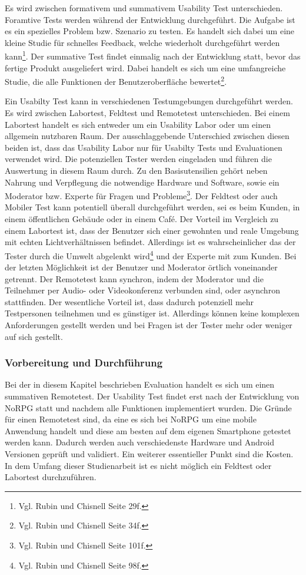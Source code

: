 		Es wird zwischen formativem und summativem Usability Test unterschieden. Foramtive Tests werden während der Entwicklung durchgeführt. Die Aufgabe ist es ein spezielles Problem bzw. Szenario zu testen. Es handelt sich dabei um eine kleine Studie für schnelles Feedback, welche wiederholt durchgeführt werden kann\footnote{Vgl. Rubin und Chisnell \cite{handbookUsability} Seite 29f.}. Der summative Test findet einmalig nach der Entwicklung statt, bevor das fertige Produkt ausgeliefert wird. Dabei handelt es sich um eine umfangreiche Studie, die alle Funktionen der Benutzeroberfläche bewertet\footnote{Vgl. Rubin und Chisnell \cite{handbookUsability} Seite 34f.}.
		
		Ein Usabilty Test kann in verschiedenen Testumgebungen durchgeführt werden. Es wird zwischen Labortest, Feldtest und Remotetest unterschieden. Bei einem Labortest handelt es sich entweder um ein Usability Labor oder um einen allgemein nutzbaren Raum. Der ausschlaggebende Unterschied zwischen diesen beiden ist, dass das Usability Labor nur für Usabilty Tests und Evaluationen verwendet wird. Die potenziellen Tester werden eingeladen und führen die Auswertung in diesem Raum durch. Zu den Basisutensilien gehört neben Nahrung und Verpflegung die notwendige Hardware und Software, sowie ein Moderator bzw. Experte für Fragen und Probleme\footnote{Vgl. Rubin und Chisnell \cite{handbookUsability} Seite 101f.}. Der Feldtest oder auch Mobiler Test kann potentiell überall durchgeführt werden, sei es beim Kunden, in einem öffentlichen Gebäude oder in einem Café. Der Vorteil im Vergleich zu einem Labortest ist, dass der Benutzer sich einer gewohnten und reale Umgebung mit echten Lichtverhältnissen befindet. Allerdings ist es wahrscheinlicher das der Tester durch die Umwelt abgelenkt wird\footnote{Vgl. Rubin und Chisnell \cite{handbookUsability} Seite 98f.} und der Experte mit zum Kunden. Bei der letzten Möglichkeit ist der Benutzer und Moderator örtlich voneinander getrennt. Der Remotetest kann synchron, indem der Moderator und die Teilnehmer per Audio- oder Videokonferenz verbunden sind, oder asynchron stattfinden. Der wesentliche Vorteil ist, dass dadurch potenziell mehr Testpersonen teilnehmen und es günstiger ist. Allerdings können keine komplexen Anforderungen gestellt werden und bei Fragen ist der Tester mehr oder weniger auf sich gestellt.
		
		\subsubsection{Vorbereitung und Durchführung}
			Bei der in diesem Kapitel beschrieben Evaluation handelt es sich um einen summativen Remotetest. Der Usability Test findet erst nach der Entwicklung von NoRPG statt und nachdem alle Funktionen implementiert wurden. Die Gründe für einen Remotetest sind, da eine es sich bei NoRPG um eine mobile Anwendung handelt und diese am besten auf dem eigenen Smartphone getestet werden kann. Dadurch werden auch verschiedenste Hardware und Android Versionen geprüft und validiert. Ein weiterer essentieller Punkt sind die Kosten. In dem Umfang dieser Studienarbeit ist es nicht möglich ein Feldtest oder Labortest durchzuführen.
	
